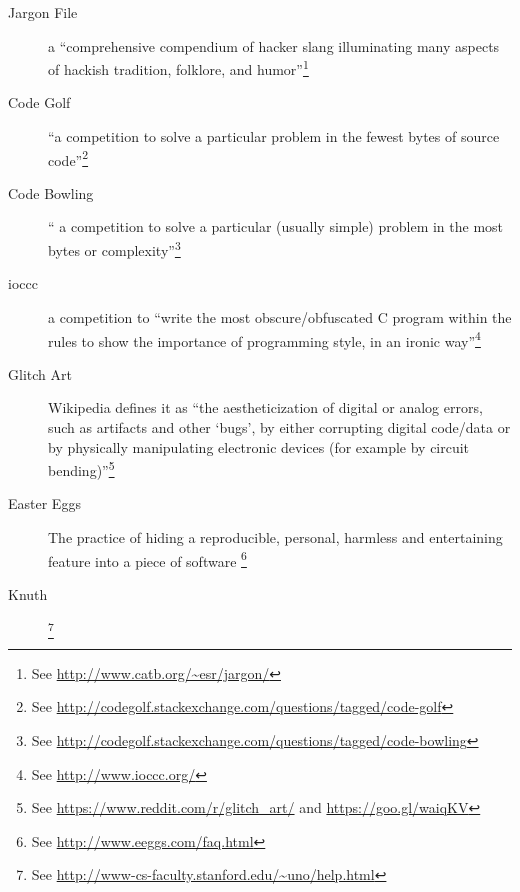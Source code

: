 \begin{description}
  \item [Jargon File] a ``comprehensive compendium of hacker slang illuminating many aspects of hackish tradition, folklore, and humor''\footnote{See \url{http://www.catb.org/~esr/jargon/}}
  \item [Code Golf] ``a competition to solve a particular problem in the fewest bytes of source code''\footnote{See \url{http://codegolf.stackexchange.com/questions/tagged/code-golf}}
  \item [Code Bowling] `` a competition to solve a particular (usually simple) problem in the most bytes or complexity''\footnote{See \url{http://codegolf.stackexchange.com/questions/tagged/code-bowling}}
  \item [\gls{ioccc}] a competition to ``write the most obscure/obfuscated C program within the rules to show the importance of programming style, in an ironic way''\footnote{See \url{http://www.ioccc.org/}}
  \item [Glitch Art] Wikipedia defines it as ``the aestheticization of digital or analog errors, such as artifacts and other `bugs', by either corrupting digital code/data or by physically manipulating electronic devices (for example by circuit bending)''\footnote{See \url{https://www.reddit.com/r/glitch_art/} and \url{https://goo.gl/waiqKV}}
  \item [Easter Eggs] The practice of hiding a reproducible, personal, harmless and entertaining feature into a piece of software \footnote{See \url{http://www.eeggs.com/faq.html}}
  \item [Knuth] \footnote{See \url{http://www-cs-faculty.stanford.edu/~uno/help.html}}
\end{description}



\stopcontents[chapters]
